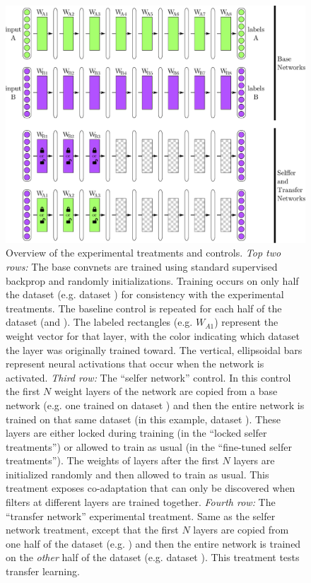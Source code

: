 \begin{figure}[t]
\begin{center}
\includegraphics[width=1\linewidth]{drawings/transfer.pdf}
\end{center}
\caption{Overview of the experimental treatments and controls. \emph{Top two rows:} The base convnets are trained using standard supervised backprop and randomly initializations. Training occurs on only half the dataset (e.g. dataset \dA) for consistency with the experimental treatments. The baseline control is repeated for each half of the dataset (\dA and \dB). The labeled rectangles (e.g. $W_{A1}$) represent the weight vector for that layer, with the color indicating which dataset the layer was originally trained toward. The vertical, ellipsoidal bars represent neural activations that occur when the network is activated.
\emph{Third row:} The ``selfer network'' control. In this control the first $N$ weight layers of the network are copied from a base network (e.g. one trained on dataset \dB) and then the entire network is trained on that same dataset (in this example, dataset \dB). These layers are either locked during training (in the ``locked selfer treatments'') or allowed to train as usual (in the ``fine-tuned selfer treatments''). The weights of layers after the first $N$ layers are initialized randomly and then allowed to train as usual. This treatment exposes co-adaptation that can only be discovered when filters at different layers are trained together. \emph{Fourth row:} The ``transfer network'' experimental treatment. Same as the selfer network treatment, except that the first $N$ layers are copied from one half of the dataset (e.g. \dA) and then the entire network is trained on the \emph{other} half of the dataset (e.g. dataset \dB). This treatment tests transfer learning.}
\label{fig:transfer}
\end{figure}


